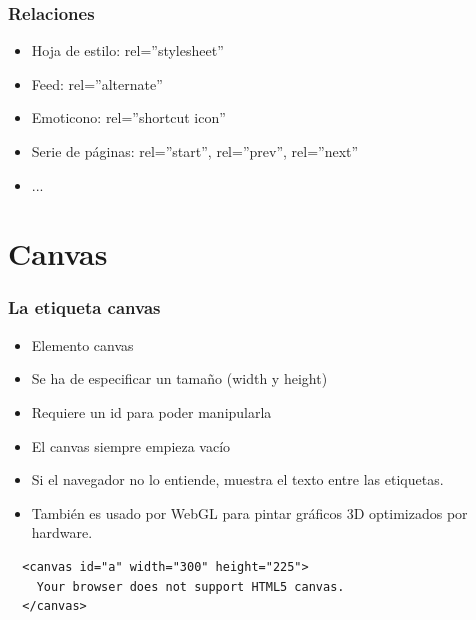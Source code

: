 
\begin{frame}
\frametitle{Relaciones}

\begin{itemize}
  \item Hoja de estilo: rel=''stylesheet''
  \item Feed: rel=''alternate''
  \item Emoticono: rel=''shortcut icon''
  \item Serie de páginas:  rel=''start'', rel=''prev'', rel=''next''
  \item ...
\end{itemize}

\end{frame}



\section{Canvas}

\begin{frame}[fragile]
\frametitle{La etiqueta canvas}

\begin{itemize}
  \item Elemento canvas
  \item Se ha de especificar un tamaño (width y height)
  \item Requiere un id para poder manipularla
  \item El canvas siempre empieza vacío
  \item Si el navegador no lo entiende, muestra el texto entre las etiquetas.
  \item También es usado por WebGL para pintar gráficos 3D optimizados por hardware.
\end{itemize}

\begin{verbatim}
  <canvas id="a" width="300" height="225">
    Your browser does not support HTML5 canvas.
  </canvas>
\end{verbatim}

\end{frame}


